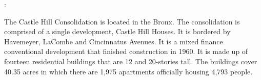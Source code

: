 :   

    

The Castle Hill Consolidation is located in the Bronx. The consolidation is comprised of a single development, Castle Hill Houses. It is bordered by Havemeyer, LaCombe and Cincinnatus Avenues. It is a mixed finance conventional development that finished construction in 1960. It is made up of fourteen residential buildings that are 12 and 20-stories tall. The buildings cover 40.35 acres in which there are 1,975 apartments officially housing 4,793 people.     